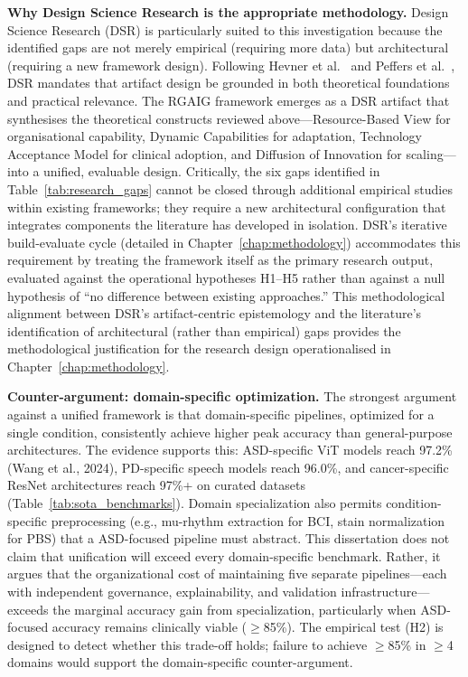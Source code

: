 \textbf{Why Design Science Research is the appropriate methodology.} Design Science Research (DSR) is particularly suited to this investigation because the identified gaps are not merely empirical (requiring more data) but architectural (requiring a new framework design). Following Hevner et al.~\cite{hevner2004design} and Peffers et al.~\cite{peffers2007dsr}, DSR mandates that artifact design be grounded in both theoretical foundations and practical relevance. The RGAIG framework emerges as a DSR artifact that synthesises the theoretical constructs reviewed above---Resource-Based View for organisational capability, Dynamic Capabilities for adaptation, Technology Acceptance Model for clinical adoption, and Diffusion of Innovation for scaling---into a unified, evaluable design. Critically, the six gaps identified in Table~\ref{tab:research_gaps} cannot be closed through additional empirical studies within existing frameworks; they require a new architectural configuration that integrates components the literature has developed in isolation. DSR's iterative build-evaluate cycle (detailed in Chapter~\ref{chap:methodology}) accommodates this requirement by treating the framework itself as the primary research output, evaluated against the operational hypotheses H1--H5 rather than against a null hypothesis of ``no difference between existing approaches.'' This methodological alignment between DSR's artifact-centric epistemology and the literature's identification of architectural (rather than empirical) gaps provides the methodological justification for the research design operationalised in Chapter~\ref{chap:methodology}.

\textbf{Counter-argument: domain-specific optimization.} The strongest argument against a unified framework is that domain-specific pipelines, optimized for a single condition, consistently achieve higher peak accuracy than general-purpose architectures. The evidence supports this: ASD-specific ViT models reach 97.2\% (Wang et al., 2024), PD-specific speech models reach 96.0\%, and cancer-specific ResNet architectures reach 97\%+ on curated datasets (Table~\ref{tab:sota_benchmarks}). Domain specialization also permits condition-specific preprocessing (e.g., mu-rhythm extraction for BCI, stain normalization for PBS) that a ASD-focused pipeline must abstract. This dissertation does not claim that unification will exceed every domain-specific benchmark. Rather, it argues that the organizational cost of maintaining five separate pipelines---each with independent governance, explainability, and validation infrastructure---exceeds the marginal accuracy gain from specialization, particularly when ASD-focused accuracy remains clinically viable ($\geq$85\%). The empirical test (H2) is designed to detect whether this trade-off holds; failure to achieve $\geq$85\% in $\geq$4 domains would support the domain-specific counter-argument.
\fi %

